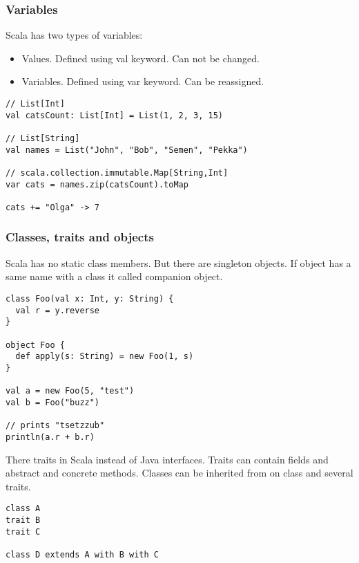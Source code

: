 \documentclass{beamer}
\begin{document}
\begin{frame}[fragile]
\frametitle{Variables}
Scala has two types of variables:
\begin{itemize}
  \item Values. Defined using val keyword. Can not be changed.
  \item Variables. Defined using var keyword. Can be reassigned.
\end{itemize}

\begin{example}
\begin{lstlisting}
// List[Int]
val catsCount: List[Int] = List(1, 2, 3, 15)

// List[String] 
val names = List("John", "Bob", "Semen", "Pekka")

// scala.collection.immutable.Map[String,Int]
var cats = names.zip(catsCount).toMap

cats += "Olga" -> 7
\end{lstlisting}
\end{example}

\end{frame}

\begin{frame}[fragile]
\frametitle{Classes, traits and objects}

Scala has no static class members. But there are singleton objects. If object has a same name with a class it called companion object.

\begin{lstlisting}
class Foo(val x: Int, y: String) {
  val r = y.reverse
}

object Foo {
  def apply(s: String) = new Foo(1, s)
}

val a = new Foo(5, "test")
val b = Foo("buzz")

// prints "tsetzzub"
println(a.r + b.r)
\end{lstlisting}

There traits in Scala instead of Java interfaces. Traits can contain fields and abstract and concrete methods. Classes can be inherited from on class and several traits.

\begin{lstlisting}
class A
trait B
trait C

class D extends A with B with C
\end{lstlisting}

\end{frame}
\end{document}
